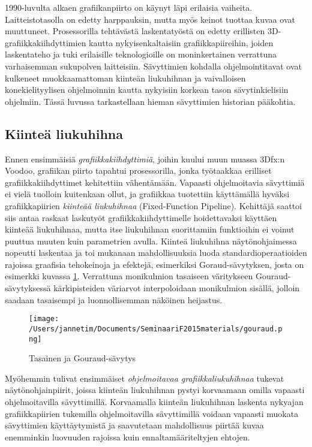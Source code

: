 \documentclass[finnish]{tktltiki2}
\theoremstyle{definition}
\theoremstyle{remark}
\begin{document}
1990-luvulta alkaen grafiikanpiirto on käynyt läpi erilaisia vaiheita. Laitteistotasolla on edetty harppauksin, mutta myös keinot tuottaa kuvaa ovat muuttuneet. Prosessorilla tehtävästä laskentatyöstä on edetty erillisten 3D-grafiikkakiihdyttimien kautta nykyisenkaltaisiin grafiikkapiireihin, joiden laskentateho ja tuki erilaisille teknologioille on moninkertainen verrattuna varhaisemman sukupolven laitteisiin. Sävyttimien kohdalla ohjelmointitavat ovat kulkeneet muokkaamattoman kiinteän liukuhihnan ja vaivalloisen konekielityylisen ohjelmoinnin kautta nykyisiin korkean tason sävytinkielisiin ohjelmiin. Tässä luvussa tarkastellaan hieman sävyttimien historian pääkohtia.

\subsection{Kiinteä liukuhihna}

Ennen ensimmäisiä \emph{grafiikkakiihdyttimiä}, joihin kuului muun muassa 3Dfx:n Voodoo, grafiikan piirto tapahtui prosessorilla, jonka työtaakkaa erilliset grafiikkakiihdyttimet kehitettiin vähentämään. Vapaasti ohjelmoitavia sävyttimiä ei vielä tuolloin kuitenkaan ollut, ja grafiikkaa tuotettiin käyttämällä hyväksi grafiikkapiirien \emph{kiinteää liukuhihnaa} (Fixed-Function Pipeline). Kehittäjä saattoi siis antaa raskaat laskutyöt grafiikkakiihdyttimelle hoidettavaksi käyttäen kiinteää liukuhihnaa, mutta itse liukuhihnan suorittamiin funktioihin ei voinut puuttua muuten kuin parametrien avulla. Kiinteä liukuhihna näytönohjaimessa nopeutti laskentaa ja toi mukanaan mahdollisuuksia luoda standardioperaatioiden rajoissa graafisia tehokeinoja ja efektejä, esimerkiksi Goraud-sävytyksen, josta on esimerkki kuvassa \ref{FGP}. Verrattuna monikulmion tasaiseen väritykseen Gouraud-sävytyksessä kärkipisteiden väriarvot interpoloidaan monikulmion sisällä, jolloin saadaan tasaisempi ja luonnollisemman näköinen heijastus.

\begin{figure}[!htpb]
\texttt{[image: /Users/jannetim/Documents/SeminaariF2015materials/gouraud.png]}
\caption{Tasainen ja Gouraud-sävytys}
\label{FGP}
\end{figure}

Myöhemmin tulivat ensimmäiset \emph{ohjelmoitavaa grafiikkaliukuhihnaa} tukevat näytönohjainpiirit, joissa kiinteän liukuhihnan pystyi korvaamaan omilla vapaasti ohjelmoitavilla sävyttimillä. Korvaamalla kiinteän liukuhihnan laskenta nykyajan grafiikkapiirien tukemilla ohjelmoitavilla sävyttimillä voidaan vapaasti muokata sävyttimien käyttäytymistä ja saavutetaan mahdollisuus piirtää kuvaa enemminkin luovuuden rajoissa kuin ennaltamääriteltyjen ehtojen. 
\end{document}
